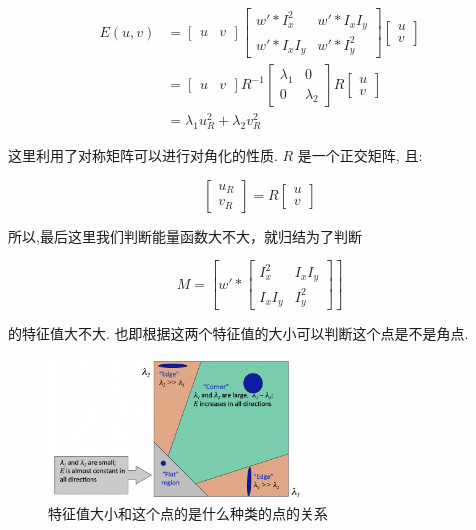 \begin{equation}
    \begin{aligned}
    E(u,v)
    &= \begin{bmatrix} u & v \end{bmatrix} \begin{bmatrix} w' \ast I_x^2 & w' \ast I_xI_y \\ w' \ast I_xI_y & w' \ast I_y^2 \end{bmatrix} \begin{bmatrix} u \\ v \end{bmatrix}\\
    &= \begin{bmatrix} u & v \end{bmatrix} R^{-1} \begin{bmatrix} \lambda_1 & 0\\ 0 & \lambda_2 \end{bmatrix} R \begin{bmatrix} u \\ v \end{bmatrix}\\
    &= \lambda_1 u_R^2 + \lambda_2 v_R^2
    \end{aligned}
\end{equation}

这里利用了对称矩阵可以进行对角化的性质. $R$ 是一个正交矩阵, 且:

\begin{equation}
    \begin{bmatrix} u_R \\ v_R \end{bmatrix} =  R \begin{bmatrix} u \\ v \end{bmatrix}
\end{equation}

所以,最后这里我们判断能量函数大不大，就归结为了判断 

\begin{equation}
    M = \left[
        w' *
        \begin{bmatrix}
        I_x^2 & I_x I_y \\
        I_x I_y & I_y^2
        \end{bmatrix}
    \right]
\end{equation}

的特征值大不大. 也即根据这两个特征值的大小可以判断这个点是不是角点.

\begin{figure}[htbp]
    \centering
    \includegraphics[width=0.6\textwidth]{figures/corner_map.png}
    \caption{特征值大小和这个点的是什么种类的点的关系}
\end{figure}

